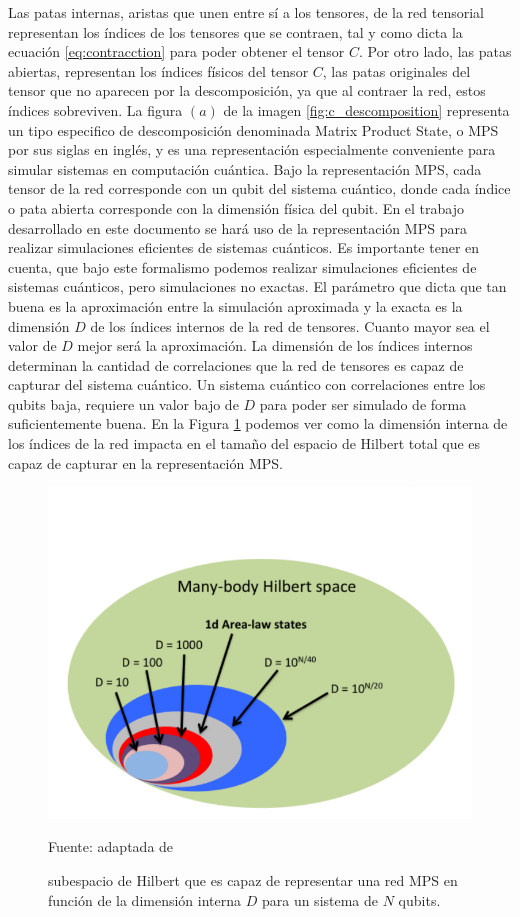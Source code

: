 \newpage

Las patas internas, aristas que unen entre sí a los tensores, de la red tensorial representan los índices de los tensores que se contraen, tal y como dicta la ecuación \ref{eq:contracction} para poder obtener el tensor $C$. Por otro lado, las patas abiertas, representan los índices físicos del tensor $C$, las patas originales del tensor que no aparecen por la descomposición, ya que al contraer la red, estos índices sobreviven. La figura $(a)$ de la imagen \ref{fig:c_descomposition} representa un tipo especifico de descomposición denominada Matrix Product State, o MPS por sus siglas en inglés, y es una representación especialmente conveniente para simular sistemas en computación cuántica. Bajo la representación MPS, cada tensor de la red corresponde con un qubit del sistema cuántico, donde cada índice o pata abierta corresponde con la dimensión física del qubit. En el trabajo desarrollado en este documento se hará uso de la representación MPS para realizar simulaciones eficientes de sistemas cuánticos. Es importante tener en cuenta, que bajo este formalismo podemos realizar simulaciones eficientes de sistemas cuánticos, pero simulaciones no exactas. El parámetro que dicta que tan buena es la aproximación entre la simulación aproximada y la exacta es la dimensión $D$ de los índices internos de la red de tensores. Cuanto mayor sea el valor de $D$ mejor será la aproximación. La dimensión de los índices internos determinan la cantidad de correlaciones que la red de tensores es capaz de capturar del sistema cuántico. Un sistema cuántico con correlaciones entre los qubits baja, requiere un valor bajo de $D$ para poder ser simulado de forma suficientemente buena. En la Figura \ref{fig:mps_hilbert_space} podemos ver como la dimensión interna de los índices de la red impacta en el tamaño del espacio de Hilbert total que es capaz de capturar en la representación MPS.


\begin{figure}[!ht]
\centering
\includegraphics[scale = 0.55]{img/03-mps_espacio_hilbert.png}
\caption{subespacio de Hilbert que es capaz de representar una red MPS en función de la dimensión interna $D$ para un sistema de $N$ qubits.}
Fuente: adaptada de \cite{orus} 
\label{fig:mps_hilbert_space}
\end{figure}

